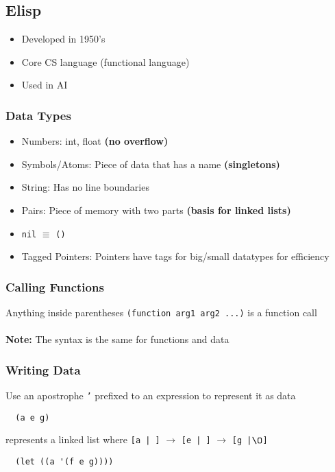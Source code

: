\documentclass[13pt]{article}
\begin{document}
\subsection{Elisp}
\begin{itemize}[leftmargin = 0pt]
\item [] Developed in 1950's
\item [] Core CS language (functional language)
\item [] Used in AI
\end{itemize}

\subsubsection{Data Types}
\begin{itemize}[leftmargin = 0pt]
\item [] Numbers: int, float \textbf{(no overflow)}
\item [] Symbols/Atoms: Piece of data that has a name \textbf{(singletons)}
\item [] String: Has no line boundaries
\item [] Pairs: Piece of memory with two parts \textbf{(basis for linked lists)}
\item [] \texttt{nil} $\equiv$ \texttt{()}
\item [] Tagged Pointers: Pointers have tags for big/small datatypes for efficiency
\end{itemize}
\subsubsection{Calling Functions}
Anything inside parentheses \texttt{(function arg1 arg2 ...)} is a function call \\ \\
\textbf{Note:} The syntax is the same for functions and data

\subsubsection{Writing Data}
Use an apostrophe \texttt{'} prefixed to an expression to represent it as data
\begin{verbatim}
  (a e g) \end{verbatim}
represents a linked list where \texttt{[a | ]} $\rightarrow$ \texttt{[e | ]} $\rightarrow$ \texttt{[g |$\O$]}
\begin{verbatim}
  (let ((a '(f e g))))\end{verbatim}
\end{document}
